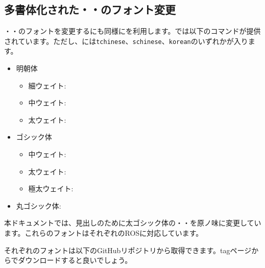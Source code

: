 \documentclass[../otf-unofficial-guide]{subfiles}
\begin{document}
\subsection{多書体化された・・のフォント変更}

{\fantizi}・{\jiantizi}・{\munja}のフォントを変更するにも同様にを利用します。では以下のコマンドが提供されています。ただし、には\texttt{tchinese}、\texttt{schinese}、\texttt{korean}のいずれかが入ります。

\begin{itemize}
  \item 明朝体
  \begin{itemize}
    \item 細ウェイト:  
    \item 中ウェイト:  
    \item 太ウェイト:  
  \end{itemize}
  \item ゴシック体
  \begin{itemize}
    \item 中ウェイト:    
    \item 太ウェイト:    
    \item 極太ウェイト:  
  \end{itemize}
  \item 丸ゴシック体:    
\end{itemize}

本ドキュメントでは、見出しのために太ゴシック体の・・を原ノ味に変更しています。これらのフォントはそれぞれのROSに対応しています。

\begin{texsource}
\end{texsource}

それぞれのフォントは以下のGitHubリポジトリから取得できます。tagページからでダウンロードすると良いでしょう。
\end{document}
